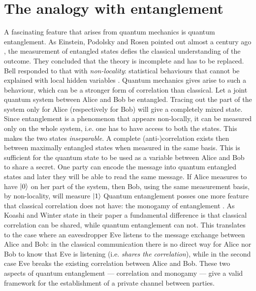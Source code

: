 \section{The analogy with entanglement}
	A fascinating feature that arises from quantum mechanics is quantum entanglement. As Einstein, Podolsky and Rosen pointed out almost a century ago \cite{einstein1935}, 
	the measurement of entangled states defies the classical understanding of the outcome. 
	They concluded that the theory is incomplete and has to be replaced.
	Bell responded to that with \emph{non-locality}: statistical behaviours that cannot be explained with local hidden variables \cite{Bell64}.
	Quantum mechanics gives arise to such a behaviour, which can be a stronger form of correlation than classical. 
	Let a joint quantum system between Alice and Bob be entangled.
	Tracing out the part of the system only for Alice (respectively for Bob) will give a completely mixed state. 
	Since entanglement is a phenomenon that appears non-locally, it can be measured only on the whole system, i.e. one has to have access to both the states.
	This makes the two states \emph{inseparable}. 
	A complete (anti-)correlation exists then between maximally entangled states when measured in the same basis.
	 This is sufficient for the quantum state to be used as a variable between Alice and Bob to share a secret\footnotemark . 
	 One party can encode the message into quantum entangled states and later they will be able to read the same message.
	If Alice measures to have $|0 \rangle$ on her part of the system, then Bob, using the same measurement basis, by non-locality, will measure $|1 \rangle$
	Quantum entanglement posses one more feature that classical correlation does not have: the monogamy of entanglement \cite{KW04}. 
	As Koashi and Winter state in their paper a fundamental difference is that classical correlation can be shared, while quantum entanglement can not. 
	This translates to the case where an eavesdropper Eve listens to the message exchange between Alice and Bob: in the classical communication there is no direct way for Alice nor Bob to know that Eve is listening (i.e. \textit{shares the correlation}), while in the second case Eve breaks the existing correlation between Alice and Bob.
These two aspects of quantum entanglement --- correlation and monogamy --- give a valid framework for the establishment of a private channel between parties.
	
	
%			
		
